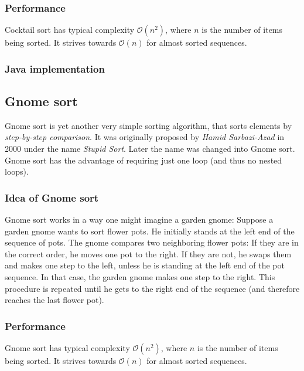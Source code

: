 \documentclass[]{pfBook}
\newcommand{\OO}{\mathcal{O}}
\begin{document}
	\subsubsection{Performance}
	
	Cocktail sort has typical complexity $\OO(n^2)$, where $n$ is the number of items being sorted. It strives towards $\OO(n)$ for almost sorted sequences.
	
	\subsubsection{Java implementation}
	
	
	
	\subsection{Gnome sort}
	
	Gnome sort is yet another very simple sorting algorithm, that sorts elements by \emph{step-by-step comparison}. It was originally proposed by \emph{Hamid Sarbazi-Azad} in 2000 under the name \emph{Stupid Sort}. Later the name was changed into Gnome sort. Gnome sort has the advantage of requiring just one loop (and thus no nested loops).
	
	\subsubsection{Idea of Gnome sort}
	
	Gnome sort works in a way one might imagine a garden gnome: Suppose a garden gnome wants to sort flower pots. He initially stands at the left end of the sequence of pots. The gnome compares two neighboring flower pots: If they are in the correct order, he moves one pot to the right. If they are not, he swaps them and makes one step to the left, unless he is standing at the left end of the pot sequence. In that case, the garden gnome makes one step to the right. This procedure is repeated until he gets to the right end of the sequence (and therefore reaches the last flower pot).
	
	\subsubsection{Performance}
	
	Gnome sort has typical complexity $\OO(n^2)$, where $n$ is the number of items being sorted. It strives towards $\OO(n)$ for almost sorted sequences.
	
\end{document}
